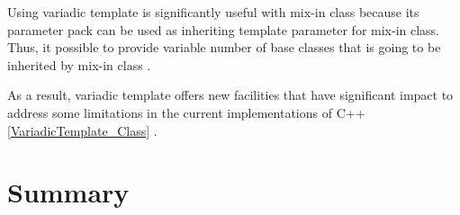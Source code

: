 \documentclass[11pt]{report}
\begin{document}
Using variadic template is significantly useful with mix-in class because its parameter pack can be used as inheriting template parameter for mix-in class. Thus, it possible to provide variable number of base classes that is going to be inherited by mix-in class \cite{Gregor:2007:VTC}.


As a result, variadic template offers new facilities that have significant impact to address some limitations in the current implementations of C++ \ref{VariadicTemplate_Class} \cite{Gregor:2007:VTC}.

\section{Summary}
\label{section1: Summary}


	
\end{document}
